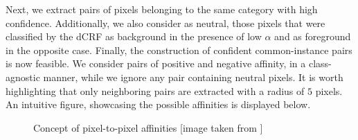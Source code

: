 Next, we extract pairs of pixels belonging to the same category with high confidence. Additionally, we also consider as neutral, those pixels that were classified by the dCRF as background in the presence of low $\alpha$ and as foreground in the opposite case. Finally, the construction of confident common-instance pairs is now feasible. We consider pairs of positive and negative affinity, in a class-agnostic manner, while we ignore any pair containing neutral pixels. It is worth highlighting that only neighboring pairs are extracted with a radius of $5$ pixels. An intuitive figure, showcasing the possible affinities is displayed below.

\begin{figure}[!h]   %
    \centering
    \caption{Concept of pixel-to-pixel affinities [image taken from \cite{ahn2018learning}]}
\end{figure}

